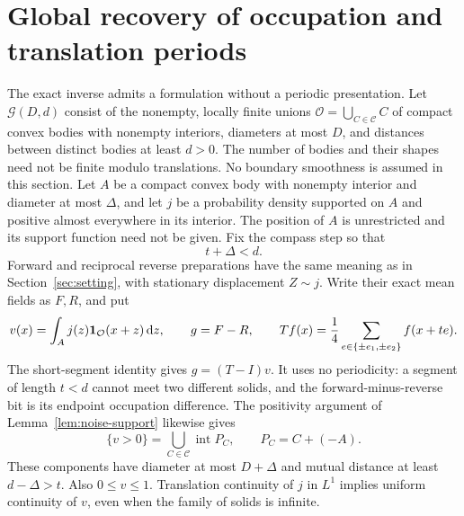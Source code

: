 \section{Global recovery of occupation and translation periods}
\label{sec:global-response}
The exact inverse admits a formulation without a periodic presentation.
Let $\mathcal G(D,d)$ consist of the nonempty, locally finite unions
$\mathcal O=\bigcup_{C\in\mathcal C}C$ of compact convex bodies with
nonempty interiors, diameters at most $D$, and distances between
distinct bodies at least $d>0$. The number of bodies and their shapes
need not be finite modulo translations. No boundary smoothness is
assumed in this section. Let $A$ be a compact convex body with nonempty
interior and diameter at most $\Delta$, and let $j$ be a probability
density supported on $A$ and positive almost everywhere in its
interior. The position of $A$ is unrestricted and its support function
need not be given. Fix the compass step so that
\begin{equation}\label{eq:global-step}
                         t+\Delta<d.
\end{equation}
Forward and reciprocal reverse preparations have the same meaning as
in Section~\ref{sec:setting}, with stationary displacement $Z\sim j$.
Write their exact mean fields as $F,R$, and put
\begin{equation}\label{eq:global-fields}
 v(x)=\int_A j(z)\mathbf 1_{\mathcal O}(x+z)\,\mathrm d z,\qquad
 g=F-R,\qquad
 Tf(x)=\frac14\sum_{e\in\{\pm e_1,\pm e_2\}}f(x+te).
\end{equation}
The short-segment identity gives $g=(T-I)v$. It uses no periodicity:
a segment of length $t<d$ cannot meet two different solids, and the
forward-minus-reverse bit is its endpoint occupation difference.
The positivity argument of Lemma~\ref{lem:noise-support} likewise gives
\begin{equation}\label{eq:global-positive-components}
 \{v>0\}=\bigcup_{C\in\mathcal C}\operatorname{int}P_C,
 \qquad P_C=C+(-A).
\end{equation}
These components have diameter at most $D+\Delta$ and mutual distance
at least $d-\Delta>t$. Also $0\le v\le1$. Translation continuity of
$j$ in $L^1$ implies uniform continuity of $v$, even when the family
of solids is infinite.

